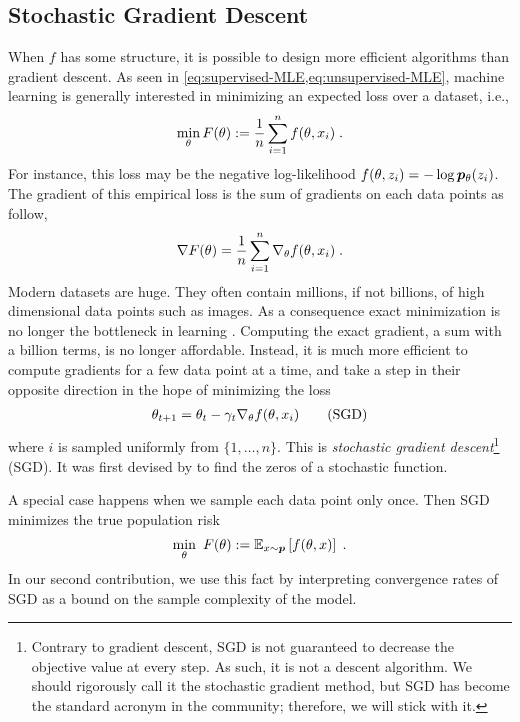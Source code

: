 \subsection{Stochastic Gradient Descent}
\label{ssec:SGD}
When $f$ has some structure, it is possible to design more efficient algorithms than gradient descent.
As seen in \cref{eq:supervised-MLE,eq:unsupervised-MLE}, machine learning is generally interested in minimizing an expected loss over a dataset, i.e.,
\begin{align}
	\min_\theta F(\theta):= \inv{n} \sum_{i=1}^n f(\theta, x_i) \; .
	\label{eq:finite-sum}
\end{align}
For instance, this loss may be the negative log-likelihood  $f(\theta, z_i) = - \log \bm{p}_{\theta}(z_i)$.
The gradient of this empirical loss is the sum of gradients on each data points as follow,
\begin{align}
	\nabla F (\theta) = \frac{1}{n}\sum_{i=1}^n \nabla_\theta f(\theta, x_i) \; .
\end{align}
Modern datasets are huge. They often contain millions, if not billions, of high dimensional data points such as images.
As a consequence exact minimization is no longer the bottleneck in learning \citep{bottou2008tradeoffs}.
Computing the exact gradient, a sum with a billion terms, is no longer affordable.
Instead, it is much more efficient to compute gradients for a few data point at a time, and take a step in their opposite direction in the hope of minimizing the loss
\begin{align}
	\theta_{t+1} = \theta_t - \gamma_t \nabla_\theta f(\theta, x_i)
	\tag{SGD}
\end{align}
where $i$ is sampled uniformly from $\{1, \dots, n\}$.
This is \emph{stochastic gradient descent}\footnote{
	Contrary to gradient descent, SGD is not guaranteed to decrease the objective value at every step.
	As such, it is not a descent algorithm.
	We should rigorously call it the stochastic gradient method, but SGD has become the standard acronym in the community; therefore, we will stick with it.
}
(SGD).
It was first devised by \citet{robbins1951stochastic} to find the zeros of a stochastic function.


A special case happens when we sample each data point only once.
Then  SGD minimizes the true population risk
\begin{align}
	\min_\theta \ F(\theta):= \expect[x\sim \ptrue]{f(\theta, x)} \; .
	\label{eq:population-risk}
\end{align}
In our second contribution, we use this fact by interpreting convergence rates of SGD as a bound on the sample complexity of the model.

